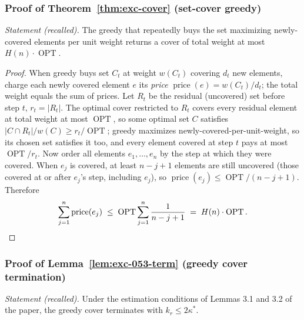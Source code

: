 \subsubsection*{Proof of Theorem~\ref{thm:exc-cover} (set-cover greedy)}
{\itshape Statement (recalled).} The greedy that repeatedly buys the set maximizing
newly-covered elements per unit weight returns a cover of total weight at most
$H(n)\cdot\operatorname{OPT}$.\eop

\begin{proof}
When greedy buys set $C_t$ at weight $w(C_t)$ covering $d_t$ new elements, charge each
newly covered element $e$ its \emph{price} $\operatorname{price}(e) = w(C_t)/d_t$; the
total weight equals the sum of prices. Let $R_t$ be the residual (uncovered) set
before step $t$, $r_t = |R_t|$. The optimal cover restricted to $R_t$ covers every
residual element at total weight at most $\operatorname{OPT}$, so some optimal set $C$
satisfies $|C\cap R_t|/w(C) \ge r_t/\operatorname{OPT}$; greedy maximizes
newly-covered-per-unit-weight, so its chosen set satisfies it too, and every element
covered at step $t$ pays at most $\operatorname{OPT}/r_t$. Now order all elements
$e_1,\dots,e_n$ by the step at which they were covered. When $e_j$ is covered, at
least $n-j+1$ elements are still uncovered (those covered at or after $e_j$'s step,
including $e_j$), so $\operatorname{price}(e_j) \le
\operatorname{OPT}/(n-j+1)$. Therefore
\[
\sum_{j=1}^{n}\operatorname{price}(e_j) \;\le\;
\operatorname{OPT}\sum_{j=1}^{n}\frac{1}{n-j+1} \;=\; H(n)\cdot\operatorname{OPT}. \qedhere
\]
\end{proof}

\subsubsection*{Proof of Lemma~\ref{lem:exc-053-term} (greedy cover termination)}
{\itshape Statement (recalled).} Under the estimation conditions of Lemmas 3.1 and 3.2
of the paper, the greedy cover terminates with $k_r \le 2\kappa^{*}$.\eop

